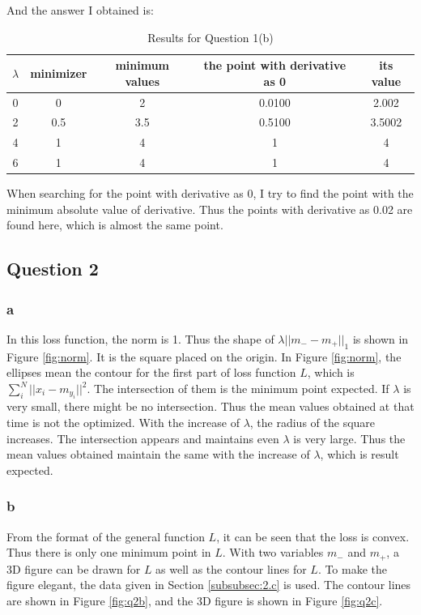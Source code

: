 \documentclass[a4paper]{scrartcl}
\begin{document}
And the answer I obtained is:
\begin{table}[!h]
\centering
\caption{Results for Question 1(b)}
\label{tab: 1core}
\begin{tabular}{|c|c c|c c|}
\hline
$\lambda$ & minimizer & minimum values & the point with derivative as 0 & its value \\
\hline
0 & 0 & 2 & 0.0100 & 2.002 \\ 
2 & 0.5 & 3.5 & 0.5100 & 3.5002 \\
4 & 1 & 4 & 1 & 4 \\
6 & 1 & 4 & 1 & 4 \\
\hline
\end{tabular}
\end{table}

When searching for the point with derivative as 0, I try to find the point with the minimum absolute value of derivative. 
Thus the points with derivative as 0.02 are found here, which is almost the same point.

\subsection{Question 2}
\subsubsection{a}
\label{subsubsection: 2.a}
In this loss function, the norm is 1. 
Thus the shape of $\lambda||m_- - m_+||_1$ is shown in Figure \ref{fig:norm}. 
It is the square placed on the origin. 
In Figure \ref{fig:norm}, the ellipses mean the contour for the first part of loss function $L$, which is $\sum_i^N ||x_i - m_{y_i}||^2$.
The intersection of them is the minimum point expected. 
If $\lambda$ is very small, there might be no intersection. Thus the mean values obtained at that time is not the optimized.
With the increase of $\lambda$, the radius of the square increases.
The intersection appears and maintains even $\lambda$ is very large. Thus the mean values obtained maintain the same with the increase of $\lambda$, which is result expected.

\subsubsection{b}
From the format of the general function $L$, it can be seen that the loss is convex. 
Thus there is only one minimum point in $L$. 
With two variables $m_-$ and $m_+$, a 3D figure can be drawn for $L$ as well as the contour lines for $L$. 
To make the figure elegant, the data given in  Section \ref{subsubsec:2.c} is used. 
The contour lines are shown in Figure \ref{fig:q2b}, and the 3D figure is shown in Figure \ref{fig:q2c}.
\end{document}
